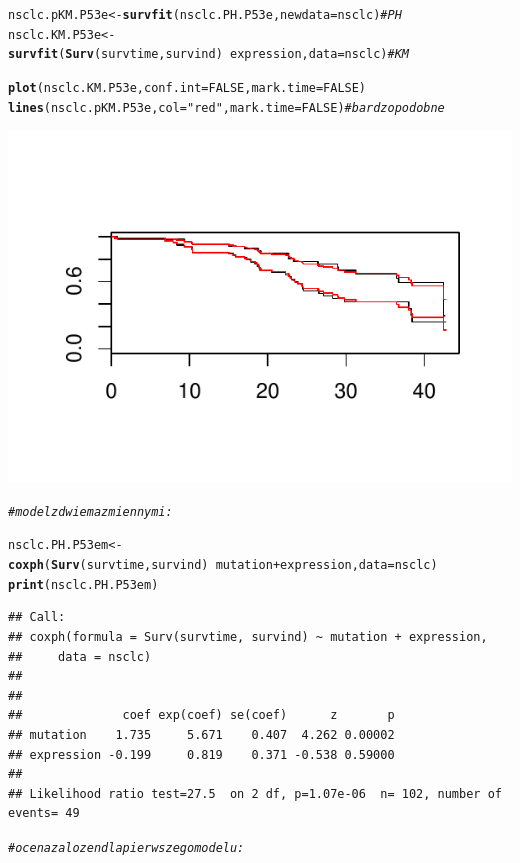 \documentclass[10pt,a4paper]{article}\usepackage[]{graphicx}\usepackage[]{color}
\makeatletter
\def\maxwidth{ %
  \ifdim\Gin@nat@width>\linewidth
    \linewidth
  \else
    \Gin@nat@width
  \fi
}
\newcommand{\hlnum}[1]{\textcolor[rgb]{0.686,0.059,0.569}{#1}}%
\newcommand{\hlstr}[1]{\textcolor[rgb]{0.192,0.494,0.8}{#1}}%
\newcommand{\hlcom}[1]{\textcolor[rgb]{0.678,0.584,0.686}{\textit{#1}}}%
\newcommand{\hlopt}[1]{\textcolor[rgb]{0,0,0}{#1}}%
\newcommand{\hlstd}[1]{\textcolor[rgb]{0.345,0.345,0.345}{#1}}%
\newcommand{\hlkwb}[1]{\textcolor[rgb]{0.69,0.353,0.396}{#1}}%
\newcommand{\hlkwc}[1]{\textcolor[rgb]{0.333,0.667,0.333}{#1}}%
\newcommand{\hlkwd}[1]{\textcolor[rgb]{0.737,0.353,0.396}{\textbf{#1}}}%
\newenvironment{kframe}{%
 \def\at@end@of@kframe{}%
 \ifinner\ifhmode%
  \def\at@end@of@kframe{\end{minipage}}%
  \begin{minipage}{\columnwidth}%
 \fi\fi%
 \def\FrameCommand##1{\hskip\@totalleftmargin \hskip-\fboxsep
 \colorbox{shadecolor}{##1}\hskip-\fboxsep
     \hskip-\linewidth \hskip-\@totalleftmargin \hskip\columnwidth}%
 \MakeFramed {\advance\hsize-\width
   \@totalleftmargin\z@ \linewidth\hsize
   \@setminipage}}%
 {\par\unskip\endMakeFramed%
 \at@end@of@kframe}
\newenvironment{knitrout}{}{} %
\makeatother
\begin{document}
\begin{knitrout}
\begin{kframe}
\begin{alltt}
\hlstd{nsclc.pKM.P53e} \hlkwb{<-} \hlkwd{survfit}\hlstd{(nsclc.PH.P53e,} \hlkwc{newdata} \hlstd{= nsclc)}  \hlcom{# PH}
\hlstd{nsclc.KM.P53e} \hlkwb{<-} \hlkwd{survfit}\hlstd{(}\hlkwd{Surv}\hlstd{(survtime, survind)} \hlopt{~} \hlstd{expression,} \hlkwc{data} \hlstd{= nsclc)}  \hlcom{# KM}

\hlkwd{plot}\hlstd{(nsclc.KM.P53e,} \hlkwc{conf.int} \hlstd{=} \hlnum{FALSE}\hlstd{,} \hlkwc{mark.time} \hlstd{=} \hlnum{FALSE}\hlstd{)}
\hlkwd{lines}\hlstd{(nsclc.pKM.P53e,} \hlkwc{col} \hlstd{=} \hlstr{"red"}\hlstd{,} \hlkwc{mark.time} \hlstd{=} \hlnum{FALSE}\hlstd{)}  \hlcom{# bardzo podobne}
\end{alltt}
\end{kframe}

{\centering \includegraphics[width=\maxwidth]{figure/unnamed-chunk-11} 

}


\begin{kframe}\begin{alltt}
\hlcom{# model z dwiema zmiennymi:}

\hlstd{nsclc.PH.P53em} \hlkwb{<-} \hlkwd{coxph}\hlstd{(}\hlkwd{Surv}\hlstd{(survtime, survind)} \hlopt{~} \hlstd{mutation} \hlopt{+} \hlstd{expression,} \hlkwc{data} \hlstd{= nsclc)}
\hlkwd{print}\hlstd{(nsclc.PH.P53em)}
\end{alltt}
\begin{verbatim}
## Call:
## coxph(formula = Surv(survtime, survind) ~ mutation + expression, 
##     data = nsclc)
## 
## 
##              coef exp(coef) se(coef)      z       p
## mutation    1.735     5.671    0.407  4.262 0.00002
## expression -0.199     0.819    0.371 -0.538 0.59000
## 
## Likelihood ratio test=27.5  on 2 df, p=1.07e-06  n= 102, number of events= 49
\end{verbatim}
\begin{alltt}
\hlcom{# ocena zalozen dla pierwszego modelu:}


\end{alltt}
\end{kframe}
\end{knitrout}
\end{document}
